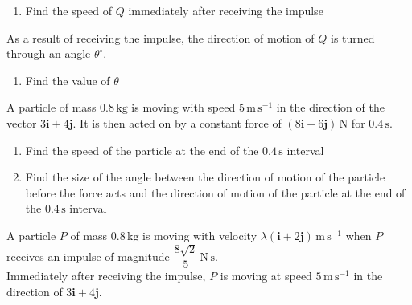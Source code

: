 \documentclass[leqno]{article}
\begin{document}
\begin{enumerate}[
  label=\textbf{\arabic*.},
  leftmargin=*,
  topsep=0pt,
  partopsep=0pt,
  parsep=0pt
]
\begin{enumerate}[label=\textbf{(\alph*)}]
  \item Find the speed of $Q$ immediately after receiving the impulse  \\
\end{enumerate}
As a result of receiving the impulse, the direction of motion of $Q$ is turned through an angle $\theta^\circ$. \\
\begin{enumerate}[label=\textbf{(\alph*)}, resume]
  \item Find the value of $\theta$  \\
\end{enumerate}

\newpage

\questionitem

A particle of mass $0.8\,\mathrm{kg}$ is moving with speed $5\,\mathrm{m\,s^{-1}}$ in the direction of the vector $3\mathbf{i}+4\mathbf{j}$. It is then acted on by a constant force of $(8\mathbf{i}-6\mathbf{j})\,\mathrm{N}$ for $0.4\,\mathrm{s}$. \\

\begin{enumerate}[label=\textbf{(\alph*)}]
  \item Find the speed of the particle at the end of the $0.4\,\mathrm{s}$ interval  \\
  \item Find the size of the angle between the direction of motion of the particle before the force acts and the direction of motion of the particle at the end of the $0.4\,\mathrm{s}$ interval  \\
\end{enumerate}

\newpage

\questionitem

A particle $P$ of mass $0.8\,\mathrm{kg}$ is moving with velocity $\lambda(\mathbf{i}+2\mathbf{j})\,\mathrm{m\,s^{-1}}$ when $P$ receives an impulse of magnitude $\dfrac{8\sqrt{2}}{5}\,\mathrm{N\,s}$. \\

Immediately after receiving the impulse, $P$ is moving at speed $5\,\mathrm{m\,s^{-1}}$ in the direction of $3\mathbf{i}+4\mathbf{j}$. \\


\end{enumerate}
\end{document}
